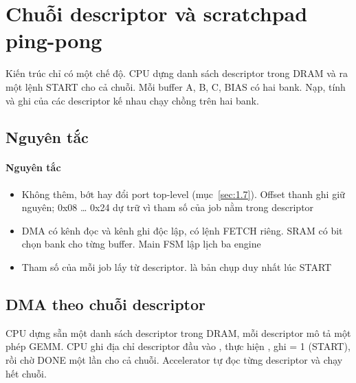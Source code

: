 \section{Chuỗi descriptor và scratchpad ping-pong}\label{sec:5}

Kiến trúc chỉ có một chế độ. CPU dựng danh sách descriptor trong DRAM và ra một lệnh START cho cả
chuỗi. Mỗi buffer A, B, C, BIAS có hai bank. Nạp, tính và ghi của các descriptor kế nhau chạy chồng
trên hai bank.

\subsection{Nguyên tắc}\label{sec:5.1}

\paragraph{Nguyên tắc}\label{par:5-1}
\begin{itemize}
\item Không thêm, bớt hay đổi port top-level (mục~\ref{sec:1.7}). Offset thanh ghi giữ nguyên; 0x08 … 0x24 dự trữ vì tham số của job nằm trong descriptor
\item DMA có kênh đọc và kênh ghi độc lập, có lệnh FETCH riêng. SRAM có bit chọn bank cho từng buffer. Main FSM lập lịch ba engine
\item Tham số của mỗi job lấy từ descriptor.  là bản chụp duy nhất lúc START
\end{itemize}

\subsection{DMA theo chuỗi descriptor}\label{sec:5.2}

CPU dựng sẵn một danh sách descriptor trong DRAM, mỗi descriptor mô tả một phép GEMM. CPU ghi địa chỉ
descriptor đầu vào , thực hiện , ghi  = 1 (START), rồi
chờ DONE một lần cho cả chuỗi. Accelerator tự đọc từng descriptor và chạy hết chuỗi.


